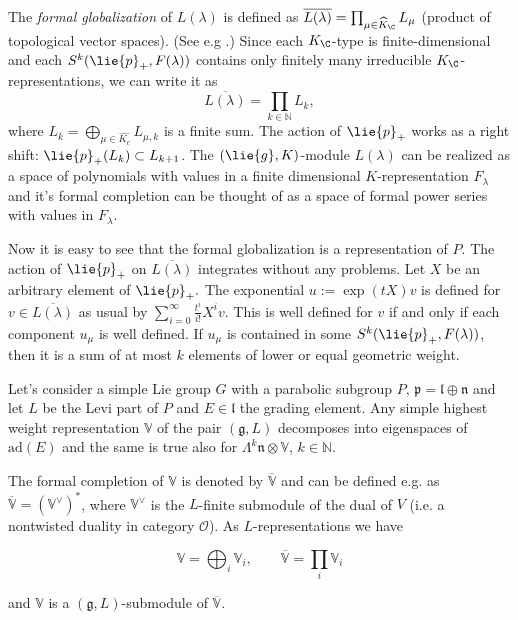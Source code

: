 The \emph{formal globalization} of $L(\lambda)$ is defined as   $\overline{L(\lambda)}=\prod_{\mu\in \widehat{K}_\C} L_\mu$ (product of topological vector spaces). (See e.g \cite{vogan_unitary_2008}.) Since each $K_\C$-type is finite-dimensional and each $S^k(\lie{p}_+,F(\lambda))$ contains only finitely many irreducible $K_\C$-representations, we can write it as
\[\overline{L(\lambda)} = \prod_{k\in\mathbb{N}} L_k,\] %
where $L_k = \bigoplus_{\mu\in\widehat{K_c}} L_{\mu,k}$ is a finite sum. The action of $\lie{p}_+$ works as a right shift: $\lie{p}_+(L_k)\subset L_{k+1}$. The $(\lie{g},K)$-module $L(\lambda)$ can be realized as a space of polynomials with values in a finite dimensional $K$-representation $F_\lambda$ and it's formal completion can be thought of as a space of formal power series with values in $F_\lambda$. %

Now it is easy to see that the formal globalization  is a representation of $P$. The action of $\lie{p}_+$ on $\overline{L(\lambda)}$ integrates without any problems. Let $X$ be an arbitrary element of $\lie{p}_+.$ The exponential $u:=\exp(tX)v$ is defined for $v\in\overline{L(\lambda)}$ as usual by $\sum_{i=0}^\infty \frac{t^i}{i!} X^iv$. This is well defined for $v$ if and only if each component $u_\mu$ is well defined. If $u_\mu$ is contained in some $S^k(\lie{p}_+,F(\lambda))$, then it is a sum of at most $k$ elements of lower or equal geometric weight.



Let's consider a simple Lie group $G$ with a parabolic subgroup $P$, $\mathfrak{p} = \mathfrak{l}\oplus\mathfrak{n}$ and let $L$ be the Levi part of $P$ and $E\in \mathfrak{l}$ the grading element. Any simple highest weight representation  $\mathbb{V}$ of the pair $(\mathfrak{g},L)$ decomposes into eigenspaces of $\mathrm{ad}(E)$ and the same is true also for $\Lambda^k\mathfrak{n}\otimes\mathbb{V}$, $k\in \mathbb{N}$.

The formal completion of $\mathbb{V}$ is denoted by $\overline{\mathbb{V}}$ and can be defined e.g. as $\overline{\mathbb{V}} = (\mathbb{V}^\vee)^*$, where $\mathbb{V}^\vee$ is the $L$-finite submodule of the dual of $V$ (i.e. a nontwisted duality  in category $\mathcal{O}$). As $L$-representations we have

$$
\mathbb{V} = \bigoplus_i \mathbb{V}_i, \qquad \overline{\mathbb{V}}  = \prod_i \mathbb{V}_i
$$

and $\mathbb{V}$ is a $(\mathfrak{g},L)$-submodule of $\overline{\mathbb{V}}$.

